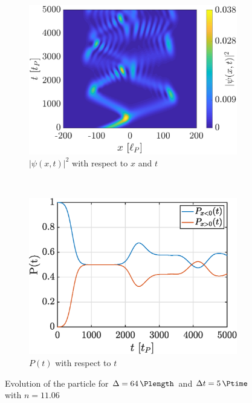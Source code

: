 \documentclass[a4paper,12pt,twoside]{article}
\begin{document}
      \begin{figure}[h]
        \centering
        \begin{subfigure}[t]{0.45\textwidth}
          \includegraphics[width=\textwidth]{graphs/iii_findn_cont_evo.eps}
          \caption{$|\psi(x, t)|^2$ with respect to $x$ and $t$}
          \label{fig:iii_findn_cont_evo}
        \end{subfigure}
        ~
        \begin{subfigure}[t]{0.45\textwidth}
          \includegraphics[width=\textwidth]{graphs/iii_findn_cont_prob.eps}
          \caption{$P(t)$ with respect to $t$}
          \label{fig:iii_findn_cont_prob}
        \end{subfigure}
        \caption{Evolution of the particle for $\Delta = \SI{64}{\Plength}$ and $\Delta t = \SI{5}{\Ptime}$ with $n=\num{11.06}$}
        \label{fig:iii_findn_cont}
      \end{figure}
\end{document}
